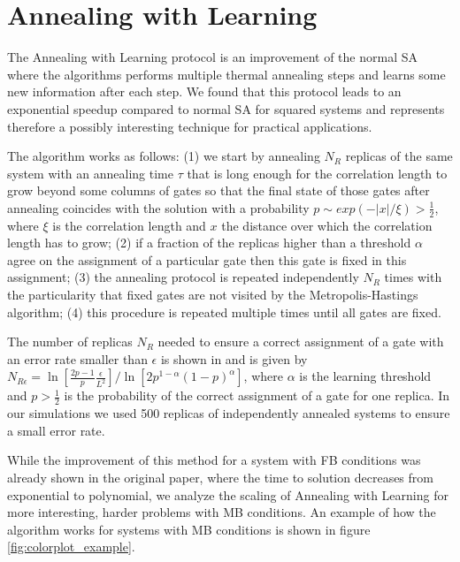 \section{Annealing with Learning}

The Annealing with Learning protocol is an improvement of the normal SA where the algorithms performs multiple thermal annealing steps and learns some new information after each step.
We found that this protocol leads to an exponential speedup compared to normal SA for squared systems and represents therefore a possibly interesting technique for practical applications.

The algorithm works as follows: (1) we start by annealing $N_R$ replicas of the same system with an annealing time $\tau$ that is long enough for the correlation length to grow beyond some columns of gates so that the final state of those gates after annealing coincides with the solution with a probability $p\sim exp(-\lvert x \rvert / \xi)>\frac{1}{2}$, where $\xi$  is the correlation length and $x$ the distance over which the correlation length has to grow; (2) if a fraction of the replicas higher than a threshold $\alpha$ agree on the assignment of a particular gate then this gate is fixed in this assignment; (3) the annealing protocol is repeated independently $N_R$ times with the particularity that fixed gates are not visited by the Metropolis-Hastings algorithm; (4) this procedure is repeated multiple times until all gates are fixed.

The number of replicas $N_R$ needed to ensure a correct assignment of a gate with an error rate smaller than $\epsilon$ is shown in \cite{Chamon} and is given by $N_{R\epsilon} = \ln \left[ \frac{2p-1}{p} \frac{\epsilon}{L^2}\right]/ \ln \left[ 2p^{1-\alpha}(1-p)^\alpha \right]$, where $\alpha$ is the learning threshold and $p>\frac{1}{2}$ is the probability of the correct assignment of a gate for one replica.
In our simulations we used 500 replicas of independently annealed systems to ensure a small error rate.

While the improvement of this method for a system with FB conditions was already shown in the original paper, where the time to solution decreases from exponential to polynomial, we analyze the scaling of Annealing with Learning for more interesting, harder problems with MB conditions.
An example of how the algorithm works for systems with MB conditions is shown in figure \ref{fig:colorplot_example}.

